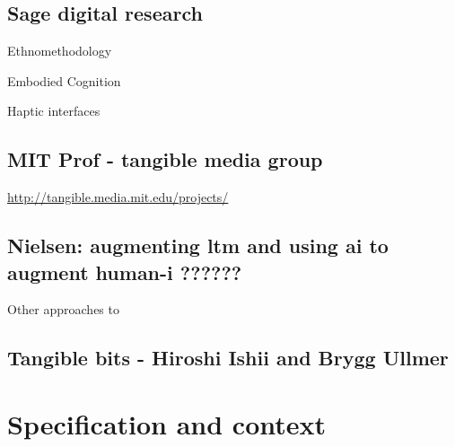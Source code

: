 \documentclass[12pt]{report}
\begin{document}
\section{Sage digital research}
\label{sec:orgb6eee0d}

Ethnomethodology

Embodied Cognition

Haptic interfaces

\section{MIT Prof - tangible media group}
\label{sec:org8fe9bbb}
\url{http://tangible.media.mit.edu/projects/}
\section{Nielsen: augmenting ltm and using ai to augment human-i ??????}
\label{sec:org120ccb6}

Other approaches to 

\cite{NielsenMich2018altm}

\cite{carter2017using}  

\section{Tangible bits - Hiroshi Ishii  and  Brygg Ullmer}
\label{sec:orgefb7d08}
\cite{IshiiH2002Tbdt}

\chapter{Specification and context}
\label{sec:org5483e9b}
\end{document}
